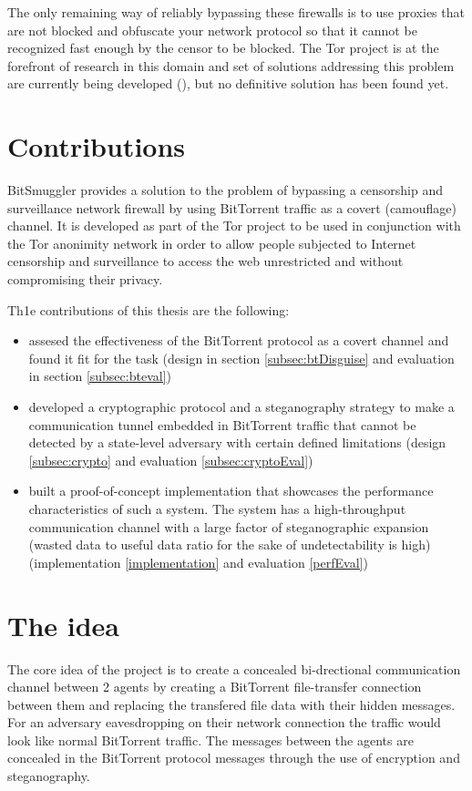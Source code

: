 \documentclass[11pt]{book} %
\newcommand{\projectName}{BitSmuggler }
\begin{document}
The only remaining way of reliably bypassing these firewalls is to use proxies that are not blocked and obfuscate your network protocol so that it cannot be recognized fast enough by the censor to be blocked. The Tor project is at the forefront of research in this domain and set of solutions addressing this problem are currently being developed (\citep*{web:torPluggableTransports}), but no definitive solution has been found yet.


\section{Contributions}
\projectName provides a solution to the problem of bypassing a censorship and surveillance network firewall by using BitTorrent traffic as a covert (camouflage) channel. It is developed as part of the Tor project to be used in conjunction with the Tor anonimity network in order to allow people subjected to Internet censorship and surveillance to access the web unrestricted and without compromising their privacy.

Th1e contributions of this thesis are the following:
\begin{itemize}
\item  assesed the effectiveness of the BitTorrent protocol as a covert channel and found it fit for the task (design in section \ref{subsec:btDisguise} and evaluation in section \ref{subsec:bteval}) 
\item developed a cryptographic protocol and a steganography strategy to make a communication tunnel embedded in BitTorrent traffic that cannot be detected by a state-level adversary with certain defined limitations (design \ref{subsec:crypto} and evaluation \ref{subsec:cryptoEval})
\item built a proof-of-concept implementation that showcases the performance characteristics of such a system. The system has a high-throughput communication channel with a large factor of steganographic expansion (wasted data to useful data ratio for the sake of undetectability is high) (implementation \ref{implementation} and evaluation \ref{perfEval})
\end{itemize}

\section {The idea}

The core idea of the project is to create a concealed bi-drectional communication channel between 2 agents by creating a BitTorrent file-transfer connection between them and replacing the transfered file data with their hidden messages. For an adversary eavesdropping on their network connection the traffic would look like normal BitTorrent traffic. The messages between the agents are concealed in the BitTorrent protocol messages through the use of encryption and steganography.
\end{document}
